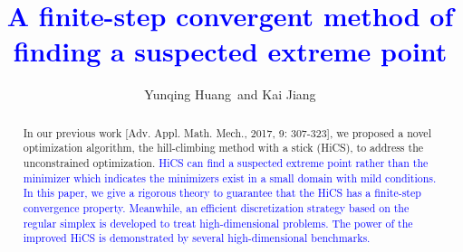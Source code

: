 \documentclass[mathpazo]{csam}
\theoremstyle{remark}
\begin{document}
	\title[HiCS]{\textcolor{blue}{A finite-step convergent method 
	of finding a suspected extreme point}}

	
	\author[Yunqing Huang and Kai Jiang]{
	Yunqing Huang\corrauth~and Kai Jiang }
	\address
	{ \ School of Mathematics and Computational Science, 
		Hunan Key Laboratory for Computation and Simulation in Science and Engineering,
		Xiangtan University, Xiangtan, Hunan, 411105, China.}
	
	\begin{abstract}
In our previous work [Adv. Appl. Math. Mech., 2017, 9: 307-323],
we proposed a novel optimization algorithm, the hill-climbing method with a stick
(HiCS), to address the unconstrained optimization. 
\textcolor{blue}{
HiCS can find a suspected extreme point rather than the minimizer which
indicates the minimizers exist in a small domain with mild conditions.   
In this paper, we give a rigorous theory to guarantee that the HiCS has 
a finite-step convergence property.
Meanwhile, an efficient discretization strategy based on the regular simplex is
developed to treat high-dimensional problems. 
The power of the improved HiCS is demonstrated by several
high-dimensional benchmarks.
}
	\end{abstract}
	
	
\end{document}
